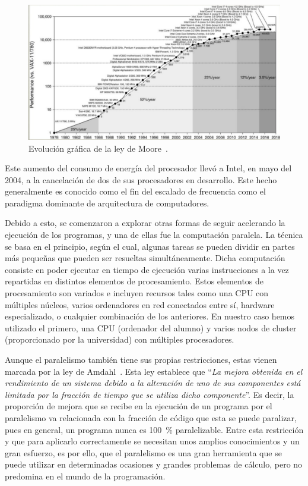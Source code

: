 \documentclass[a4paper,12pt]{article}
\begin{document}
\begin{figure}[htbp]
    \includegraphics[width=1\textwidth]{./images/leymoore.pdf}
    \centering
    \caption{Evolución gráfica de la ley de Moore~\cite{endMoore}.}
    \label{fig:moore}
\end{figure}

Este aumento del consumo de energía del procesador llevó a Intel, en mayo del 2004, a la cancelación de dos de sus procesadores en desarrollo. Este hecho generalmente es conocido como el fin del escalado de frecuencia como el paradigma dominante de arquitectura de computadores.

Debido a esto, se comenzaron a explorar otras formas de seguir acelerando la ejecución de los programas, y una de ellas fue la computación paralela. La técnica se basa en el principio, según el cual, algunas tareas se pueden dividir en partes más pequeñas que pueden ser resueltas simultáneamente. Dicha computación consiste en poder ejecutar en tiempo de ejecución varias instrucciones a la vez repartidas en distintos elementos de procesamiento. Estos elementos de procesamiento son variados e incluyen recursos tales como una CPU con múltiples núcleos, varios ordenadores en red conectados entre sí, hardware especializado, o cualquier combinación de los anteriores. En nuestro caso hemos utilizado el primero, una CPU (ordenador del alumno) y varios nodos de cluster (proporcionado por la universidad) con múltiples procesadores.

Aunque el paralelismo también tiene sus propias restricciones, estas vienen marcada por la ley de Amdahl~\cite{Amdahl}. Esta ley establece que ``{\it La mejora obtenida en el rendimiento de un sistema debido a la alteración de uno de sus componentes está limitada por la fracción de tiempo que se utiliza dicho componente}''. Es decir, la proporción de mejora que se recibe en la ejecución de un programa por el paralelismo va relacionada con la fracción de código que esta se puede paralizar, pues en general, un programa nunca es 100~\% paralelizable. Entre esta restricción y que para aplicarlo correctamente se necesitan unos amplios conocimientos y un gran esfuerzo, es por ello, que el paralelismo es una gran herramienta que se puede utilizar en determinadas ocasiones y grandes problemas de cálculo, pero no predomina en el mundo de la programación.
\end{document}
